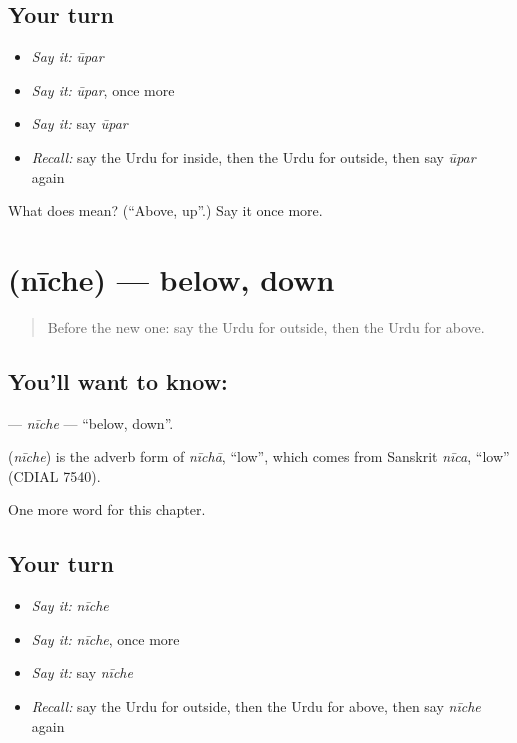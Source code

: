 \subsection*{Your turn}
\begin{itemize}
\raggedright
  \item \emph{Say it:} \emph{ūpar}
  \item \emph{Say it:} \emph{ūpar}, once more
  \item \emph{Say it:} say \emph{ūpar}
  \item \emph{Recall:} say the Urdu for inside, then the Urdu for outside, then say \emph{ūpar} again
\end{itemize}

\begin{tcolorbox}[breakable,colback=teal!4,colframe=teal!35!black,title={Before you move on}]
What does  mean? (\textquotedblleft{}Above, up\textquotedblright{}.) Say it once more.
\end{tcolorbox}
\section[\texorpdfstring{\ur{نیچے} (nīche)}{نیچے (nīche)}]{ (nīche) — below, down}

\label{lesson:UR-C79-niche}



\begin{quote}
Before the new one: say the Urdu for outside, then the Urdu for above.
\end{quote}

\subsection*{You'll want to know: }
\textbf{} — \emph{nīche} — \textquotedblleft{}below, down\textquotedblright{}.

\begin{cousinweb}
\textbf{} (\emph{nīche}) is the adverb form of \emph{nīchā}, \textquotedblleft{}low\textquotedblright{}, which comes from Sanskrit \emph{nīca}, \textquotedblleft{}low\textquotedblright{} (CDIAL 7540).
\end{cousinweb}

\begin{grammarlens}[title={What you've built}]
One more word for this chapter.
\end{grammarlens}

\subsection*{Your turn}
\begin{itemize}
\raggedright
  \item \emph{Say it:} \emph{nīche}
  \item \emph{Say it:} \emph{nīche}, once more
  \item \emph{Say it:} say \emph{nīche}
  \item \emph{Recall:} say the Urdu for outside, then the Urdu for above, then say \emph{nīche} again
\end{itemize}

